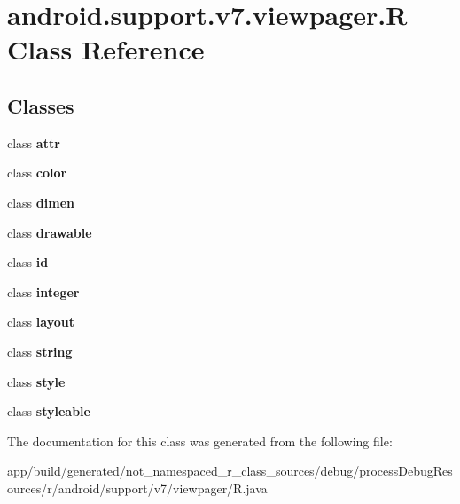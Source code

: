 \hypertarget{classandroid_1_1support_1_1v7_1_1viewpager_1_1_r}{}\section{android.\+support.\+v7.\+viewpager.\+R Class Reference}
\label{classandroid_1_1support_1_1v7_1_1viewpager_1_1_r}
\subsection*{Classes}
\begin{DoxyCompactItemize}
\item 
class {\bfseries attr}
\item 
class {\bfseries color}
\item 
class {\bfseries dimen}
\item 
class {\bfseries drawable}
\item 
class {\bfseries id}
\item 
class {\bfseries integer}
\item 
class {\bfseries layout}
\item 
class {\bfseries string}
\item 
class {\bfseries style}
\item 
class {\bfseries styleable}
\end{DoxyCompactItemize}


The documentation for this class was generated from the following file\+:\begin{DoxyCompactItemize}
\item 
app/build/generated/not\+\_\+namespaced\+\_\+r\+\_\+class\+\_\+sources/debug/process\+Debug\+Resources/r/android/support/v7/viewpager/R.\+java\end{DoxyCompactItemize}
